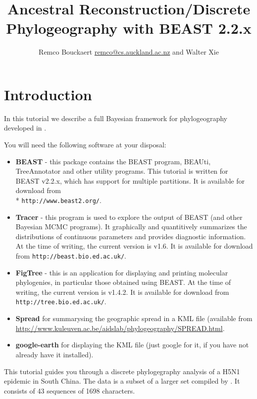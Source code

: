 \documentclass{article}
\newcommand{\BEASTVersion}{2.2.x}
\newcommand{\TracerVersion}{1.6}
\newcommand{\FigTreeVersion}{1.4.2}
\begin{document}
\title{Ancestral Reconstruction/Discrete Phylogeography with BEAST {\BEASTVersion}}
\author{Remco Bouckaert \url{remco@cs.auckland.ac.nz} and Walter Xie}
\maketitle

\section{Introduction}


In this tutorial we describe a full Bayesian framework for phylogeography developed in \cite{Lemey:2009uq}.

You will need the following software at your disposal:

\begin{itemize}

\item {\bf BEAST} - this package contains the BEAST program, BEAUti, TreeAnnotator and other utility programs. This tutorial is written for BEAST v{\BEASTVersion}, which has support for multiple partitions. It is available for download from \\* \texttt{http://www.beast2.org/}.
\item {\bf Tracer} - this program is used to explore the output of BEAST (and other Bayesian MCMC programs). It graphically and
quantitively summarizes the distributions of continuous parameters and provides diagnostic information. At the time of
writing, the current version is v{\TracerVersion}. It is available for download from \texttt{http://beast.bio.ed.ac.uk/}.
\item {\bf FigTree} - this is an application for displaying and printing molecular phylogenies, in particular those obtained using
BEAST. At the time of writing, the current version is v{\FigTreeVersion}. It is available for download from \texttt{http://tree.bio.ed.ac.uk/}.
\item {\bf Spread} for summarysing the geographic spread in a KML file (available from \url{http://www.kuleuven.ac.be/aidslab/phylogeography/SPREAD.html}.
\item {\bf google-earth} for displaying the KML file (just google for it, if you have not already have it installed).
\end{itemize}


This tutorial guides you through a discrete phylogegraphy analysis of a H5N1 epidemic in South China.
The data is a subset of a larger set compiled by \cite{wallace:2007st}.
It consists of 43 sequences of 1698 characters.
\end{document}
